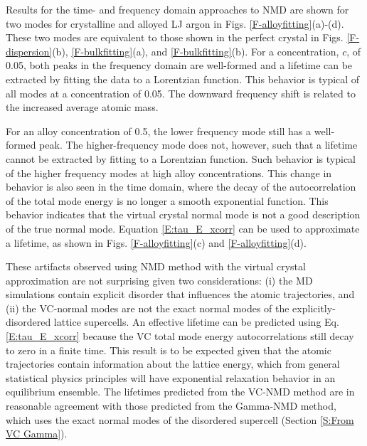 Results for the time- and frequency domain approaches to NMD 
are shown for two modes for crystalline and alloyed LJ argon in 
Figs. \ref{F-alloyfitting}(a)-(d). These two modes are equivalent to 
those shown in the perfect crystal in 
Figs. \ref{F-dispersion}(b), \ref{F-bulkfitting}(a), and 
\ref{F-bulkfitting}(b). For a concentration, $c$, of 0.05, both peaks 
in the frequency domain are well-formed and a lifetime can be extracted 
by fitting the data to a Lorentzian function. This behavior is typical 
of all modes at a concentration of 0.05. The downward frequency shift 
is related to the increased average atomic mass.

For an alloy concentration of 0.5, the lower frequency mode still has 
a well-formed peak. The higher-frequency mode does not, however, such 
that a lifetime cannot be extracted by fitting to a Lorentzian function. 
Such behavior is typical of the higher frequency modes at high alloy 
concentrations. This change in behavior is also seen in the time domain, 
where the decay of the autocorrelation of the total mode energy is no 
longer a smooth exponential function. This behavior indicates that the 
virtual crystal normal mode is not a good description of the true 
normal mode. Equation \eqref{E:tau_E_xcorr} can be used to approximate a 
lifetime, as shown in Figs. \ref{F-alloyfitting}(c) and 
\ref{F-alloyfitting}(d).

These artifacts observed using NMD method with the virtual crystal 
approximation are not surprising given two considerations: 
(i) the MD simulations 
contain explicit disorder that influences the atomic trajectories, 
and (ii) the VC-normal modes are not the exact normal modes of the 
explicitly-disordered lattice supercells. 
An effective lifetime can be predicted 
using Eq. \eqref{E:tau_E_xcorr} 
because the VC total mode energy autocorrelations 
still decay to zero in a finite time. This result is to be expected 
given that the atomic trajectories contain 
information about the lattice energy, which from general statistical 
physics principles will have exponential relaxation behavior in an 
equilibrium ensemble.
\cite{landau_statistical_1980,srivastava_physics_1990,
rajabpour_thermal_2010} The lifetimes predicted from the VC-NMD method 
are in reasonable agreement with those predicted from the Gamma-NMD 
method, which uses the exact normal modes of the disordered supercell 
(Section \ref{S:From VC Gamma}).  


